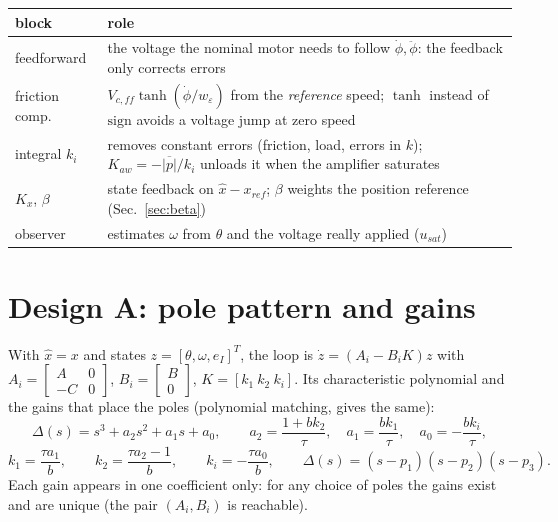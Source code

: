 \documentclass[10pt,a4paper]{article}
\newcommand{\code}[1]{\texttt{\detokenize{#1}}}
\begin{document}
\begin{tabularx}{\linewidth}{@{}l X@{}}
\toprule
block & role \\
\midrule
feedforward & the voltage the nominal motor needs to follow $\dot\phi,\ddot\phi$: the feedback only corrects errors \\
friction comp. & $V_{c,ff}\tanh(\dot\phi/w_\varepsilon)$ from the \emph{reference} speed; $\tanh$ instead of $\mathrm{sign}$ avoids a voltage jump at zero speed \\
integral $k_i$ & removes constant errors (friction, load, errors in $k$); $K_{aw}=-\overline{|p|}/k_i$ unloads it when the amplifier saturates \\
$K_x$, $\beta$ & state feedback on $\hat x-x_{ref}$; $\beta$ weights the position reference (Sec.~\ref{sec:beta}) \\
observer & estimates $\omega$ from $\theta$ and the voltage really applied ($u_{sat}$) \\
\bottomrule
\end{tabularx}

\section{Design A: pole pattern and gains}\label{sec:designA}

With $\hat x=x$ and states $z=[\theta,\omega,e_I]^T$, the loop is $\dot z=(A_i-B_iK)z$ with
$A_i=\begin{bmatrix}A&0\\-C&0\end{bmatrix}$, $B_i=\begin{bmatrix}B\\0\end{bmatrix}$, $K=[k_1\ k_2\ k_i]$.
Its characteristic polynomial and the gains that place the poles (polynomial matching, \code{acker} gives the same):
\begin{equation}
  \Delta(s)=s^3+a_2s^2+a_1s+a_0,\qquad
  a_2=\frac{1+bk_2}{\tau},\quad a_1=\frac{bk_1}{\tau},\quad a_0=-\frac{bk_i}{\tau},
\end{equation}
\begin{equation}\label{eq:gains}
  k_1=\frac{\tau a_1}{b},\qquad k_2=\frac{\tau a_2-1}{b},\qquad k_i=-\frac{\tau a_0}{b},\qquad
  \Delta(s)=(s-p_1)(s-p_2)(s-p_3).
\end{equation}
Each gain appears in one coefficient only: for any choice of poles the gains exist and are unique (the pair $(A_i,B_i)$ is
reachable).
\end{document}
